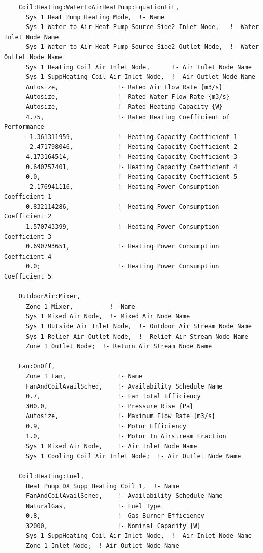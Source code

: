 \begin{lstlisting}
    Coil:Heating:WaterToAirHeatPump:EquationFit,
      Sys 1 Heat Pump Heating Mode,  !- Name
      Sys 1 Water to Air Heat Pump Source Side2 Inlet Node,   !- Water Inlet Node Name
      Sys 1 Water to Air Heat Pump Source Side2 Outlet Node,  !- Water Outlet Node Name
      Sys 1 Heating Coil Air Inlet Node,      !- Air Inlet Node Name
      Sys 1 SuppHeating Coil Air Inlet Node,  !- Air Outlet Node Name
      Autosize,                !- Rated Air Flow Rate {m3/s}
      Autosize,                !- Rated Water Flow Rate {m3/s}
      Autosize,                !- Rated Heating Capacity {W}
      4.75,                    !- Rated Heating Coefficient of Performance
      -1.361311959,            !- Heating Capacity Coefficient 1
      -2.471798046,            !- Heating Capacity Coefficient 2
      4.173164514,             !- Heating Capacity Coefficient 3
      0.640757401,             !- Heating Capacity Coefficient 4
      0.0,                     !- Heating Capacity Coefficient 5
      -2.176941116,            !- Heating Power Consumption Coefficient 1
      0.832114286,             !- Heating Power Consumption Coefficient 2
      1.570743399,             !- Heating Power Consumption Coefficient 3
      0.690793651,             !- Heating Power Consumption Coefficient 4
      0.0;                     !- Heating Power Consumption Coefficient 5

    OutdoorAir:Mixer,
      Zone 1 Mixer,          !- Name
      Sys 1 Mixed Air Node,  !- Mixed Air Node Name
      Sys 1 Outside Air Inlet Node,  !- Outdoor Air Stream Node Name
      Sys 1 Relief Air Outlet Node,  !- Relief Air Stream Node Name
      Zone 1 Outlet Node;  !- Return Air Stream Node Name

    Fan:OnOff,
      Zone 1 Fan,              !- Name
      FanAndCoilAvailSched,    !- Availability Schedule Name
      0.7,                     !- Fan Total Efficiency
      300.0,                   !- Pressure Rise {Pa}
      Autosize,                !- Maximum Flow Rate {m3/s}
      0.9,                     !- Motor Efficiency
      1.0,                     !- Motor In Airstream Fraction
      Sys 1 Mixed Air Node,    !- Air Inlet Node Name
      Sys 1 Cooling Coil Air Inlet Node;  !- Air Outlet Node Name

    Coil:Heating:Fuel,
      Heat Pump DX Supp Heating Coil 1,  !- Name
      FanAndCoilAvailSched,    !- Availability Schedule Name
      NaturalGas,              !- Fuel Type
      0.8,                     !- Gas Burner Efficiency
      32000,                   !- Nominal Capacity {W}
      Sys 1 SuppHeating Coil Air Inlet Node,  !- Air Inlet Node Name
      Zone 1 Inlet Node;  !-Air Outlet Node Name


\end{lstlisting}
